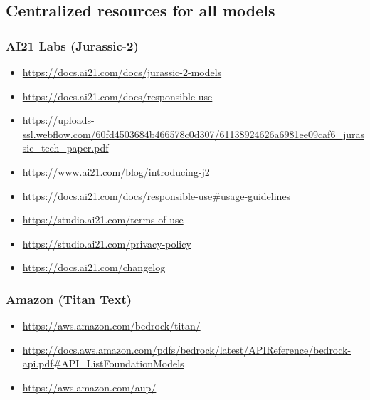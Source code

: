 \subsection{Centralized resources for all models}

\subsubsection{AI21 Labs (Jurassic-2)}
\begin{itemize}
    \item \url{https://docs.ai21.com/docs/jurassic-2-models}
    \item \url{https://docs.ai21.com/docs/responsible-use}
    \item \url{https://uploads-ssl.webflow.com/60fd4503684b466578c0d307/61138924626a6981ee09caf6_jurassic_tech_paper.pdf}
    \item \url{https://www.ai21.com/blog/introducing-j2}
    \item \url{https://docs.ai21.com/docs/responsible-use#usage-guidelines}
    \item \url{https://studio.ai21.com/terms-of-use}
    \item \url{https://studio.ai21.com/privacy-policy}
    \item \url{https://docs.ai21.com/changelog}
\end{itemize}

\subsubsection{Amazon (Titan Text)}
\begin{itemize}
    \item \url{https://aws.amazon.com/bedrock/titan/}
    \item \url{https://docs.aws.amazon.com/pdfs/bedrock/latest/APIReference/bedrock-api.pdf#API_ListFoundationModels}
    \item \url{https://aws.amazon.com/aup/}
\end{itemize}

